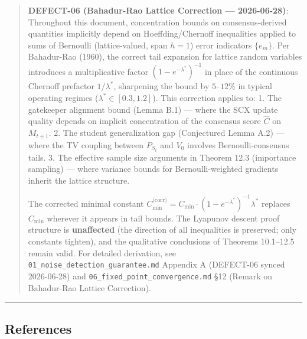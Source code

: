 \documentclass[
  12pt,
]{ctexart}
\begin{document}
\begin{quote}
\textbf{DEFECT-06 (Bahadur-Rao Lattice Correction --- 2026-06-28)}:
Throughout this document, concentration bounds on consensus-derived
quantities implicitly depend on Hoeffding/Chernoff inequalities applied
to sums of Bernoulli (lattice-valued, span \(h=1\)) error indicators
\(\{e_m\}\). Per Bahadur-Rao (1960), the correct tail expansion for
lattice random variables introduces a multiplicative factor
\((1 - e^{-\lambda^*})^{-1}\) in place of the continuous Chernoff
prefactor \(1/\lambda^*\), sharpening the bound by \(5\)--\(12\%\) in
typical operating regimes (\(\lambda^* \in [0.3, 1.2]\)). This
correction applies to: 1. The gatekeeper alignment bound (Lemma B.1) ---
where the SCX update quality depends on implicit concentration of the
consensus score \(\hat{C}\) on \(M_{t+1}\). 2. The student
generalization gap (Conjectured Lemma A.2) --- where the TV coupling
between \(P_{S_t}\) and \(V_0\) involves Bernoulli-consensus tails. 3.
The effective sample size arguments in Theorem 12.3 (importance
sampling) --- where variance bounds for Bernoulli-weighted gradients
inherit the lattice structure.

The corrected minimal constant
\(C_{\min}^{\text{(corr)}} = C_{\min} \cdot (1 - e^{-\lambda^*})^{-1} \lambda^*\)
replaces \(C_{\min}\) wherever it appears in tail bounds. The Lyapunov
descent proof structure is \textbf{unaffected} (the direction of all
inequalities is preserved; only constants tighten), and the qualitative
conclusions of Theorems 10.1--12.5 remain valid. For detailed
derivation, see \texttt{01\_noise\_detection\_guarantee.md} Appendix A
(DEFECT-06 synced 2026-06-28) and
\texttt{06\_fixed\_point\_convergence.md} §12 (Remark on Bahadur-Rao
Lattice Correction).
\end{quote}

\begin{center}\rule{0.5\linewidth}{0.5pt}\end{center}

\subsection{References}\label{references}
\end{document}
